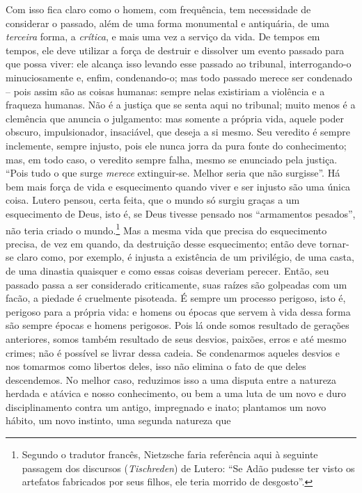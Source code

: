 Com isso fica claro como o homem, com frequência, tem necessidade de
considerar o passado, além de uma forma monumental e antiquária, de uma
\emph{terceira} forma, a \emph{crítica}, e mais uma vez a serviço da
vida. De tempos em tempos, ele deve utilizar a força de destruir e
dissolver um evento passado para que possa viver: ele alcança isso
levando esse passado ao tribunal, interrogando-o minuciosamente e, enfim,
condenando-o; mas todo passado merece ser condenado -- pois assim são as
coisas humanas: sempre nelas existiriam a violência e a fraqueza
humanas. Não é a justiça que se senta aqui no tribunal; muito menos é a
clemência que anuncia o julgamento: mas somente a própria vida, aquele
poder obscuro, impulsionador, insaciável, que deseja a si mesmo. Seu
veredito é sempre inclemente, sempre injusto, pois ele nunca jorra da
pura fonte do conhecimento; mas, em todo caso, o veredito sempre falha,
mesmo se enunciado pela justiça. ``Pois tudo o que surge
\emph{merece} extinguir-se. Melhor seria que não surgisse''. Há bem mais
força de vida e esquecimento quando viver e ser injusto são uma única
coisa. Lutero pensou, certa feita, que o mundo só surgiu graças a um
esquecimento de Deus, isto é, se Deus tivesse pensado nos ``armamentos
pesados'', não teria criado o mundo.\footnote{Segundo o tradutor francês,
  Nietz\-sche faria referência aqui à seguinte passagem dos discursos
  (\emph{Tischreden}) de Lutero: ``Se Adão pudesse ter visto os
  artefatos fabricados por seus filhos, ele teria morrido de desgosto''.}
Mas a mesma vida que precisa do esquecimento precisa, de vez em quando,
da destruição desse esquecimento; então deve tornar-se claro como, por
exemplo, é injusta a existência de um privilégio, de uma casta, de uma
dinastia quaisquer e como essas coisas deveriam perecer. Então, seu
passado passa a ser considerado criticamente, suas raízes são
golpeadas com um facão, a piedade é cruelmente pisoteada. É sempre
um processo perigoso, isto é, perigoso para a própria vida: e homens ou
épocas que servem à vida dessa forma são sempre épocas e homens 
perigosos. Pois lá onde somos resultado de gerações anteriores, somos
também resultado de seus desvios, paixões, erros e até mesmo crimes; não
é possível se livrar dessa cadeia. Se condenarmos aqueles desvios e nos
tomarmos como libertos deles, isso não elimina o fato de que deles
descendemos.\label{delesdescendemos} No melhor caso, reduzimos isso a uma disputa entre a
natureza herdada e atávica e nosso conhecimento, ou bem a uma luta de um
novo e duro disciplinamento contra um antigo, impregnado e inato;
plantamos um novo hábito, um novo instinto, uma segunda natureza que
